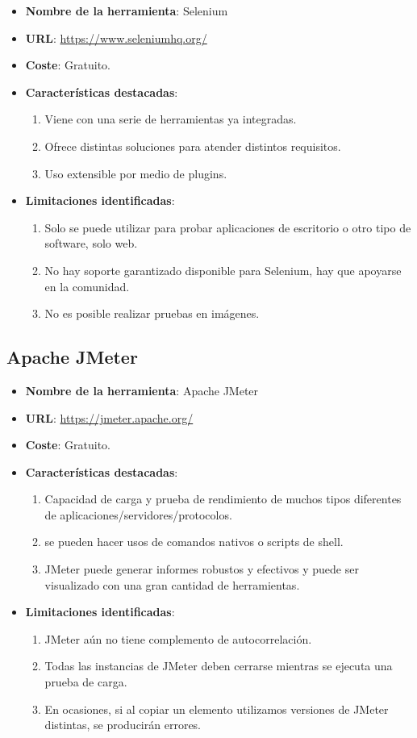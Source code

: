 \begin{itemize}
	\item \textbf{Nombre de la herramienta}: Selenium
	\item \textbf{URL}: \url{https://www.seleniumhq.org/}
	\item \textbf{Coste}: Gratuito.
	\item \textbf{Características destacadas}:
	\begin{enumerate}
		\item Viene con una serie de herramientas ya integradas.
		\item Ofrece distintas soluciones para atender distintos requisitos.
		\item Uso extensible por medio de plugins.
	\end{enumerate}
	\item \textbf{Limitaciones identificadas}:
	\begin{enumerate}
		\item Solo se puede utilizar para probar aplicaciones de escritorio o otro tipo de software, solo web. 
		\item No hay soporte garantizado disponible para Selenium, hay que apoyarse en la comunidad.
		\item No es posible realizar pruebas en imágenes.
	\end{enumerate}
\end{itemize}

\subsection{Apache JMeter}

\begin{itemize}
	\item \textbf{Nombre de la herramienta}: Apache JMeter
	\item \textbf{URL}: \url{https://jmeter.apache.org/}
	\item \textbf{Coste}: Gratuito.
	\item \textbf{Características destacadas}:
	\begin{enumerate}
		\item Capacidad de carga y prueba de rendimiento de muchos tipos diferentes de aplicaciones/servidores/protocolos.
		\item se pueden hacer usos de comandos nativos o scripts de shell.
		\item JMeter puede generar informes robustos y efectivos y puede ser visualizado con una gran cantidad de herramientas.
	\end{enumerate}
	\item \textbf{Limitaciones identificadas}:
	\begin{enumerate}
		\item JMeter aún no tiene complemento de autocorrelación.
		\item Todas las instancias de JMeter deben cerrarse mientras se ejecuta una prueba de carga.
		\item En ocasiones, si al copiar un elemento utilizamos versiones de JMeter distintas, se producirán errores.
	\end{enumerate}
\end{itemize}

